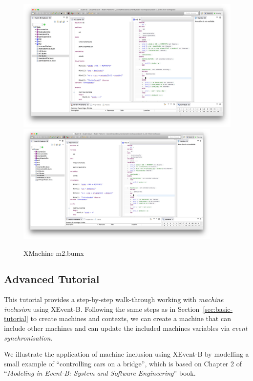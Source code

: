   \begin{figure}[!htbp]
    \centering
    \ifplastex
    \includegraphics[width=512]{figures/M2}
    \else
    \includegraphics[width=0.9\textwidth]{figures/M2}
    \fi
    \caption{XMachine m2.bumx}
    \label{fig:M2}
  \end{figure}

\subsection{Advanced Tutorial}
\label{sec:advanced-tutorial}

This tutorial provides a step-by-step walk-through working with \emph{machine inclusion} using XEvent-B. Following the same steps as in Section~\ref{sec:basic-tutorial} to create machines and contexts, we can create a machine that can include other machines and can update the included machines variables via \emph{event synchronisation}.

We illustrate the application of machine inclusion using XEvent-B by modelling a small example of ``controlling cars on a bridge'', which is based on Chapter 2 of ``\emph{Modeling in Event-B: System and Software Engineering}'' book.

